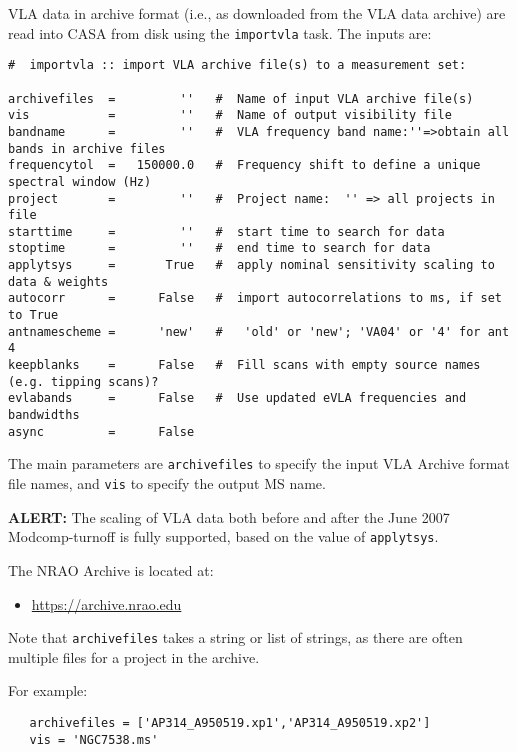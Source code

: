 VLA data in archive format (i.e., as downloaded from the VLA data archive)
are read into CASA from disk using the {\tt importvla} task.  The inputs are:
\small
\begin{verbatim}
#  importvla :: import VLA archive file(s) to a measurement set:

archivefiles  =         ''   #  Name of input VLA archive file(s)
vis           =         ''   #  Name of output visibility file
bandname      =         ''   #  VLA frequency band name:''=>obtain all bands in archive files
frequencytol  =   150000.0   #  Frequency shift to define a unique spectral window (Hz)
project       =         ''   #  Project name:  '' => all projects in file
starttime     =         ''   #  start time to search for data
stoptime      =         ''   #  end time to search for data
applytsys     =       True   #  apply nominal sensitivity scaling to data & weights
autocorr      =      False   #  import autocorrelations to ms, if set to True
antnamescheme =      'new'   #   'old' or 'new'; 'VA04' or '4' for ant 4
keepblanks    =      False   #  Fill scans with empty source names (e.g. tipping scans)?
evlabands     =      False   #  Use updated eVLA frequencies and bandwidths
async         =      False        
\end{verbatim}
\normalsize

The main parameters are {\tt archivefiles} to specify the input
VLA Archive format file names, and {\tt vis} to specify the output
MS name. 

{\bf ALERT:} The scaling of VLA data both before and after the
June 2007 Modcomp-turnoff is fully supported, based on the value of
{\tt applytsys}.  

The NRAO Archive is located at:
\begin{itemize}
  \item \url{https://archive.nrao.edu}
\end{itemize}
Note that {\tt archivefiles} takes a string or list of
strings, as there are often multiple files for a project in the
archive.

For example:
\small
\begin{verbatim}
   archivefiles = ['AP314_A950519.xp1','AP314_A950519.xp2']
   vis = 'NGC7538.ms'
\end{verbatim}
\normalsize

